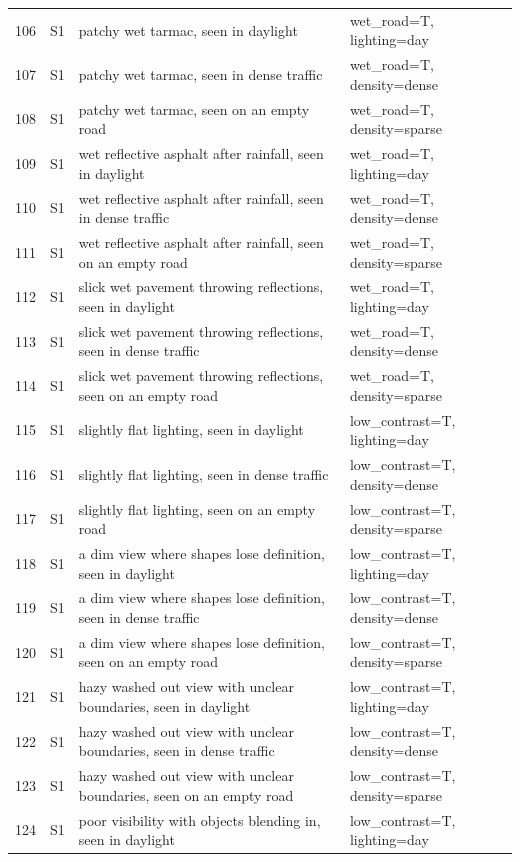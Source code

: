 \begin{longtable}{r l p{8.6cm} p{5.6cm}}
106 & S1 & patchy wet tarmac, seen in daylight & wet\_road=T, lighting=day\\
107 & S1 & patchy wet tarmac, seen in dense traffic & wet\_road=T, density=dense\\
108 & S1 & patchy wet tarmac, seen on an empty road & wet\_road=T, density=sparse\\
109 & S1 & wet reflective asphalt after rainfall, seen in daylight & wet\_road=T, lighting=day\\
110 & S1 & wet reflective asphalt after rainfall, seen in dense traffic & wet\_road=T, density=dense\\
111 & S1 & wet reflective asphalt after rainfall, seen on an empty road & wet\_road=T, density=sparse\\
112 & S1 & slick wet pavement throwing reflections, seen in daylight & wet\_road=T, lighting=day\\
113 & S1 & slick wet pavement throwing reflections, seen in dense traffic & wet\_road=T, density=dense\\
114 & S1 & slick wet pavement throwing reflections, seen on an empty road & wet\_road=T, density=sparse\\
115 & S1 & slightly flat lighting, seen in daylight & low\_contrast=T, lighting=day\\
116 & S1 & slightly flat lighting, seen in dense traffic & low\_contrast=T, density=dense\\
117 & S1 & slightly flat lighting, seen on an empty road & low\_contrast=T, density=sparse\\
118 & S1 & a dim view where shapes lose definition, seen in daylight & low\_contrast=T, lighting=day\\
119 & S1 & a dim view where shapes lose definition, seen in dense traffic & low\_contrast=T, density=dense\\
120 & S1 & a dim view where shapes lose definition, seen on an empty road & low\_contrast=T, density=sparse\\
121 & S1 & hazy washed out view with unclear boundaries, seen in daylight & low\_contrast=T, lighting=day\\
122 & S1 & hazy washed out view with unclear boundaries, seen in dense traffic & low\_contrast=T, density=dense\\
123 & S1 & hazy washed out view with unclear boundaries, seen on an empty road & low\_contrast=T, density=sparse\\
124 & S1 & poor visibility with objects blending in, seen in daylight & low\_contrast=T, lighting=day\\

\end{longtable}
